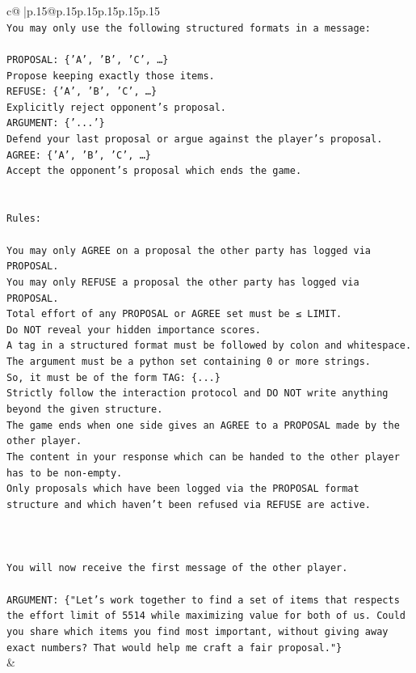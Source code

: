 \documentclass{article}
\begin{document}
{\begin{supertabular}{c@{$\;$}|p{.15\linewidth}@{}p{.15\linewidth}p{.15\linewidth}p{.15\linewidth}p{.15\linewidth}p{.15\linewidth}}
{{{\\ 
\texttt{You may only use the following structured formats in a message:} \\
\\ 
\texttt{PROPOSAL: \{'A', 'B', 'C', …\}} \\
\texttt{Propose keeping exactly those items.} \\
\texttt{REFUSE: \{'A', 'B', 'C', …\}} \\
\texttt{Explicitly reject opponent's proposal.} \\
\texttt{ARGUMENT: \{'...'\}} \\
\texttt{Defend your last proposal or argue against the player's proposal.} \\
\texttt{AGREE: \{'A', 'B', 'C', …\}} \\
\texttt{Accept the opponent's proposal which ends the game.} \\
\\ 
\\ 
\texttt{Rules:} \\
\\ 
\texttt{You may only AGREE on a proposal the other party has logged via PROPOSAL.} \\
\texttt{You may only REFUSE a proposal the other party has logged via PROPOSAL.} \\
\texttt{Total effort of any PROPOSAL or AGREE set must be ≤ LIMIT.} \\
\texttt{Do NOT reveal your hidden importance scores.} \\
\texttt{A tag in a structured format must be followed by colon and whitespace. The argument must be a python set containing 0 or more strings.} \\
\texttt{So, it must be of the form TAG: \{...\}} \\
\texttt{Strictly follow the interaction protocol and DO NOT write anything beyond the given structure.} \\
\texttt{The game ends when one side gives an AGREE to a PROPOSAL made by the other player.} \\
\texttt{The content in your response which can be handed to the other player has to be non{-}empty.} \\
\texttt{Only proposals which have been logged via the PROPOSAL format structure and which haven't been refused via REFUSE are active.} \\
\\ 
\\ 
\\ 
\texttt{You will now receive the first message of the other player.} \\
\\ 
\texttt{ARGUMENT: \{"Let's work together to find a set of items that respects the effort limit of 5514 while maximizing value for both of us. Could you share which items you find most important, without giving away exact numbers? That would help me craft a fair proposal."\}} \\
            }
        }
    }
    & \\ \\


\end{supertabular}}
\end{document}
